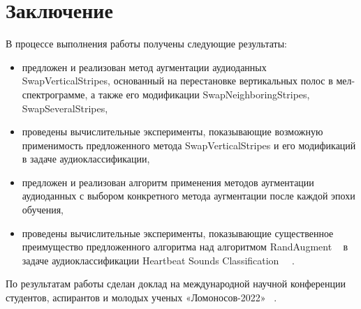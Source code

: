 \documentclass[12pt, fleqn]{article}
\begin{document}
\section{Заключение}

В процессе выполнения работы получены следующие результаты:

\begin{itemize}
    \item предложен и реализован метод аугментации аудиоданных SwapVerticalStripes, основанный на перестановке вертикальных полос в мел-спектрограмме, а также его модификации SwapNeighboringStripes, SwapSeveralStripes,
    \item проведены вычислительные эксперименты, показывающие возможную применимость предложенного метода SwapVerticalStripes и его модификаций в задаче аудиоклассификации,
    \item предложен и реализован алгоритм применения методов аугментации аудиоданных с выбором конкретного метода аугментации после каждой эпохи обучения,
    \item проведены вычислительные эксперименты, показывающие существенное преимущество предложенного алгоритма над алгоритмом RandAugment ~\cite{RandAugment} в задаче аудиоклассификации Heartbeat Sounds Classification ~\cite{HeartbeatSoundsArticle}~\cite{HeartbeatSoundsKaggle}.
\end{itemize}

По результатам работы сделан доклад на международной научной конференции
студентов, аспирантов и молодых ученых «Ломоносов-2022» ~\cite{Lomonosov}.
\end{document}
